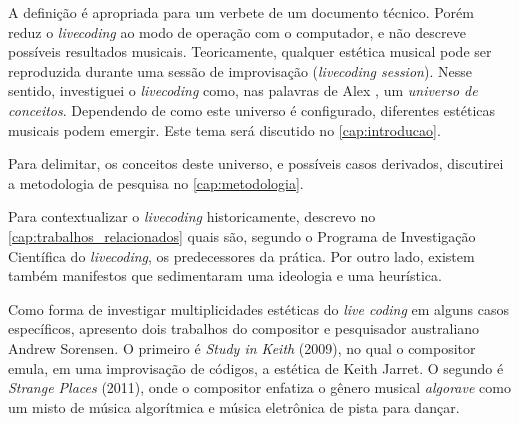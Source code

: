 A definição é apropriada para um verbete de um documento técnico. Porém reduz o \emph{livecoding} ao modo de operação com o computador, e não descreve possíveis resultados musicais. Teoricamente, qualquer estética musical pode ser reproduzida durante uma sessão de improvisação (\emph{livecoding session}). Nesse sentido, investiguei o \emph{livecoding} como, nas palavras de Alex , um \emph{universo de conceitos}. Dependendo de como este universo é configurado, diferentes estéticas musicais podem emergir. Este tema será discutido no \autoref{cap:introducao}. 


Para delimitar, os conceitos deste universo, e possíveis casos derivados, discutirei a metodologia de pesquisa no \autoref{cap:metodologia}. 

Para contextualizar o \emph{livecoding} historicamente, descrevo no \autoref{cap:trabalhos_relacionados} quais são, segundo o Programa de Investigação Científica do \emph{livecoding}, os predecessores da prática. Por outro lado, existem também manifestos que sedimentaram uma ideologia e uma heurística.

Como forma de investigar multiplicidades estéticas do \emph{live coding} em alguns casos específicos, apresento dois trabalhos do compositor e pesquisador australiano Andrew Sorensen. O primeiro é \emph{Study in Keith} (2009), no qual o compositor emula, em uma improvisação de códigos, a estética de Keith Jarret. O segundo é \emph{Strange Places} (2011), onde o compositor enfatiza o gênero musical \emph{algorave} como um misto de música algorítmica e música eletrônica de pista para dançar.